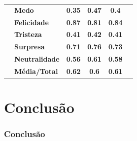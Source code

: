 \documentclass{beamer}
\begin{document}
\begin{frame}
\begin{table}[]
\begin{tabular}{llcccc}
                                       & \textbf{Medo}         & \textbf{0.35}                         & \textbf{0.47}                          & \textbf{0.4}                          &                                       \\
                                       & \textbf{Felicidade}   & \textbf{0.87}                         & \textbf{0.81}                          & \textbf{0.84}                         &                                       \\
                                       & \textbf{Tristeza}     & \textbf{0.41}                         & \textbf{0.42}                          & \textbf{0.41}                         &                                       \\
                                       & \textbf{Surpresa}     & \textbf{0.71}                         & \textbf{0.76}                          & \textbf{0.73}                         &                                       \\
                                       & \textbf{Neutralidade} & \textbf{0.56}                         & \textbf{0.61}                          & \textbf{0.58}                         &                                       \\
                                       & \textbf{Média/Total}  & \textbf{0.62}                         & \textbf{0.6}                           & \textbf{0.61}                         &                                       \\ \hline
\end{tabular}
\end{table}
\end{frame}




\section{Conclusão}
\begin{frame}
\frametitle{Conclusão}

\end{frame}
\end{document}
